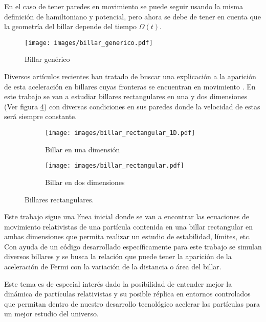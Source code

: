 \documentclass[11pt, spanish]{book}
\begin{document}
\vspace{3mm}

En el caso de tener paredes en movimiento se puede seguir usando la misma definición de hamiltoniano y potencial, pero ahora se debe de tener en cuenta que la geometría del billar depende del tiempo \( \Omega(t) \).

\begin{figure}[H]
    \centering
    \texttt{[image: images/billar\_generico.pdf]}
    \caption{Billar genérico}
    \label{fig:bilar_generico}
\end{figure}

Diversos artículos recientes han tratado de buscar una explicación a la aparición de esta aceleración en billares cuyas fronteras se encuentran en movimiento \cite{EnergyDifussion,SuppressingFermi, SuppressingFermi2, ReferenciaProfe, NonAutonomous, ExponentialEnergy, GeneralBilliard, GeneralBilliard2}. En este trabajo se van a estudiar billares rectangulares en una y dos dimensiones (Ver figura \ref{fig:billar_rectangular}) con diversas condiciones en sus paredes donde la velocidad de estas será siempre constante.

\begin{figure}[H]
    \centering
    \begin{subfigure}[b]{0.5\textwidth}
        \centering
        \texttt{[image: images/billar\_rectangular\_1D.pdf]}
        \caption{Billar en una dimensión}
        \label{fig:billar_rectangular_1D}
    \end{subfigure}
    \hfill
    \begin{subfigure}[b]{0.49\textwidth}
        \centering
        \texttt{[image: images/billar\_rectangular.pdf]}
        \caption{Billar en dos dimensiones}
        \label{fig:billar_rectangular_2D}
    \end{subfigure}
    \caption{Billares rectangulares.}
        \label{fig:billar_rectangular}
\end{figure}

Este trabajo sigue una línea inicial donde se van a encontrar las ecuaciones de movimiento relativistas de una partícula contenida en una billar rectangular en ambas dimensiones que permita realizar un estudio de estabilidad, límites, etc. Con ayuda de un código desarrollado específicamente para este trabajo se simulan diversos billares y se busca la relación que puede tener la aparición de la aceleración de Fermi con la variación de la distancia o área del billar.

\vspace{3mm}

Este tema es de especial interés dado la posibilidad de entender mejor la dinámica de partículas relativistas y su posible réplica en entornos controlados que permitan dentro de nuestro desarrollo tecnológico acelerar las partículas para un mejor estudio del universo. 
\end{document}
